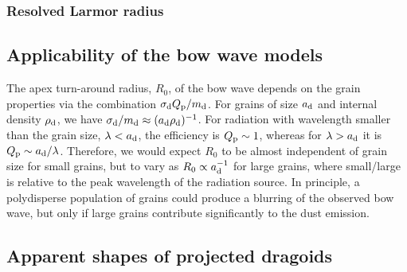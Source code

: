 \subsubsection{Resolved Larmor radius}
\label{sec:resolv-larm-radi}



\subsection{Applicability of the bow wave models}
\label{sec:dust-applicability}

The apex turn-around radius, \(R_0\), of the bow wave depends on the
grain properties via the combination \(\sigma_{\text{d}} Q_{\text{p}} / m_{\text{d}}\).  For
grains of size \(a_{\text{d}}\) and internal density \(\rho_{\text{d}}\), we have
\(\sigma_{\text{d}} / m_{\text{d}} \approx (a_{\text{d}} \rho_{\text{d}})^{-1}\).  For radiation with
wavelength smaller than the grain size, \(\lambda < a_{\text{d}}\), the
efficiency is \(Q_{\text{p}} \sim 1\), whereas for \(\lambda > a_{\text{d}}\) it is
\(Q_{\text{p}} \sim a_{\text{d}}/\lambda\).  Therefore, we would expect \(R_0\) to be almost
independent of grain size for small grains, but to vary as
\(R_0 \propto a_{\text{d}}^{-1}\) for large grains, where small/large is relative
to the peak wavelength of the radiation source.  In principle, a
polydisperse population of grains could produce a blurring of the
observed bow wave, but only if large grains contribute significantly
to the dust emission.





\subsection{Apparent shapes of projected dragoids}
\label{sec:dust-wave-apparent}

